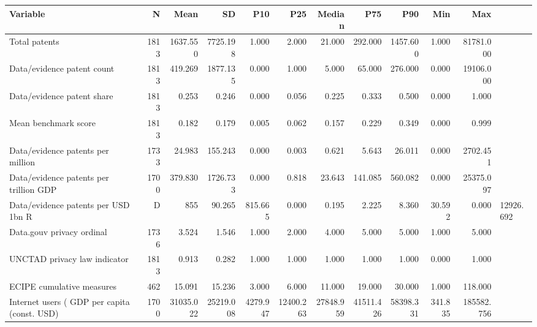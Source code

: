 \begin{tabular}{lrrrrrrrrrr}
\toprule
Variable & N & Mean & SD & P10 & P25 & Median & P75 & P90 & Min & Max \\
\midrule
Total patents & 1813 & 1637.550 & 7725.198 & 1.000 & 2.000 & 21.000 & 292.000 & 1457.600 & 1.000 & 81781.000 \\
Data/evidence patent count & 1813 & 419.269 & 1877.135 & 0.000 & 1.000 & 5.000 & 65.000 & 276.000 & 0.000 & 19106.000 \\
Data/evidence patent share & 1813 & 0.253 & 0.246 & 0.000 & 0.056 & 0.225 & 0.333 & 0.500 & 0.000 & 1.000 \\
Mean benchmark score & 1813 & 0.182 & 0.179 & 0.005 & 0.062 & 0.157 & 0.229 & 0.349 & 0.000 & 0.999 \\
Data/evidence patents per million & 1733 & 24.983 & 155.243 & 0.000 & 0.003 & 0.621 & 5.643 & 26.011 & 0.000 & 2702.451 \\
Data/evidence patents per trillion GDP & 1700 & 379.830 & 1726.733 & 0.000 & 0.818 & 23.643 & 141.085 & 560.082 & 0.000 & 25375.097 \\
Data/evidence patents per USD 1bn R&D & 855 & 90.265 & 815.665 & 0.000 & 0.195 & 2.225 & 8.360 & 30.592 & 0.000 & 12926.692 \\
Data.gouv privacy ordinal & 1736 & 3.524 & 1.546 & 1.000 & 2.000 & 4.000 & 5.000 & 5.000 & 1.000 & 5.000 \\
UNCTAD privacy law indicator & 1813 & 0.913 & 0.282 & 1.000 & 1.000 & 1.000 & 1.000 & 1.000 & 0.000 & 1.000 \\
ECIPE cumulative measures & 462 & 15.091 & 15.236 & 3.000 & 6.000 & 11.000 & 19.000 & 30.000 & 1.000 & 118.000 \\
Internet users (%
GDP per capita (const. USD) & 1700 & 31035.022 & 25219.008 & 4279.947 & 12400.263 & 27848.959 & 41511.426 & 58398.331 & 341.835 & 185582.756 \\
\bottomrule
\end{tabular}
